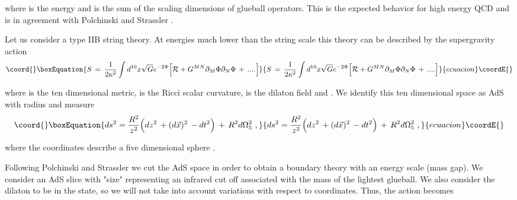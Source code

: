 \documentclass[a4paper,twocolumn,prd,groupedaddress,nofootinbib]{revtex4}
\begin{document}
\noindent where \coordHE{} is the energy and
 \myHighlight{$\Delta$}\coordHE{} is the sum of the scaling dimensions of glueball operators. 
This is the  expected behavior for high energy QCD\cite{QCD1,BRO}
and is in agreement with Polchinski and Strassler \cite{PS}. 
 

Let us consider a type IIB string theory. At energies much lower than 
the string scale \coordHE{} this theory can be described  
by  the supergravity action\cite{GKP,Po}
\begin{equation}\coord{}\boxEquation{
S \,=\, {1\over 2 \kappa^2} \int d^{10}x \sqrt{G} e^{-2\Phi} \Big[
{\cal R} + G^{MN} \partial_M \Phi \partial_N \Phi  \,+\, ....\Big]
}{
S \,=\, {1\over 2 \kappa^2} \int d^{10}x \sqrt{G} e^{-2\Phi} \Big[
{\cal R} + G^{MN} \partial_M \Phi \partial_N \Phi  \,+\, ....\Big]
}{ecuacion}\coordE{}\end{equation}

\noindent 
where \coordHE{} is the ten dimensional metric, \coordHE{} is the Ricci 
scalar curvature,  \myHighlight{$\Phi$}\coordHE{} is the dilaton field and 
\coordHE{}. 
We  identify this ten dimensional space as AdS\coordHE{}
with radius \coordHE{} and measure
\begin{equation}\coord{}\boxEquation{
\label{metric}
ds^2=\frac {R^2 }{ z^2}\Big( dz^2 \,+(d\vec x)^2\,
- dt^2 \Big) \,+ \,R^2 d\Omega_5^2 \,\,,
 }{
ds^2=\frac {R^2 }{ z^2}\Big( dz^2 \,+(d\vec x)^2\,
- dt^2 \Big) \,+ \,R^2 d\Omega_5^2 \,\,,
 }{ecuacion}\coordE{}\end{equation}

\noindent 
where the coordinates \coordHE{} describe a five dimensional sphere
\coordHE{}.  

Following Polchinski and Strassler \cite{PS} we cut the AdS space 
in order to obtain a boundary theory with an energy scale (mass gap).
We consider an AdS slice with "size" \coordHE{} representing an 
infrared cut off associated with the mass of the lightest glueball.  
We also consider the dilaton to be in the \coordHE{} state, 
so we will not take 
into account variations with respect to \coordHE{} coordinates. 
Thus, the action becomes 
\end{document}
